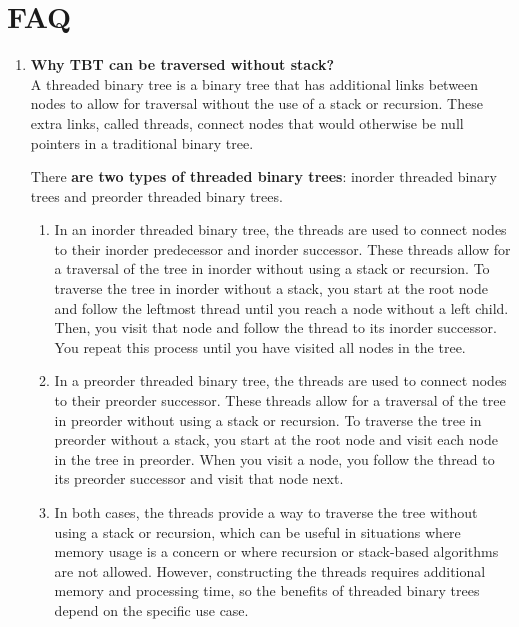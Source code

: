 \documentclass[11pt]{article}
\begin{document}
\section{FAQ}
\begin{enumerate}
    \item \textbf{Why TBT can be traversed without stack?}\\

          A threaded binary tree is a binary tree that has additional links between nodes to allow for traversal without the use of a stack or recursion. These extra links, called threads, connect nodes that would otherwise be null pointers in a traditional binary tree.

          There \textbf{are two types of threaded binary trees}: inorder threaded binary trees and preorder threaded binary trees.

          \begin{enumerate}

              \item In an inorder threaded binary tree, the threads are used to connect nodes to their inorder predecessor and inorder successor. These threads allow for a traversal of the tree in inorder without using a stack or recursion. To traverse the tree in inorder without a stack, you start at the root node and follow the leftmost thread until you reach a node without a left child. Then, you visit that node and follow the thread to its inorder successor. You repeat this process until you have visited all nodes in the tree.

              \item In a preorder threaded binary tree, the threads are used to connect nodes to their preorder successor. These threads allow for a traversal of the tree in preorder without using a stack or recursion. To traverse the tree in preorder without a stack, you start at the root node and visit each node in the tree in preorder. When you visit a node, you follow the thread to its preorder successor and visit that node next.

              \item In both cases, the threads provide a way to traverse the tree without using a stack or recursion, which can be useful in situations where memory usage is a concern or where recursion or stack-based algorithms are not allowed. However, constructing the threads requires additional memory and processing time, so the benefits of threaded binary trees depend on the specific use case.
          \end{enumerate}


\end{enumerate}
\end{document}
